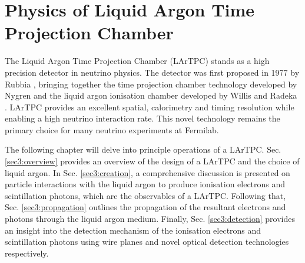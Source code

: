 \chapter{Physics of Liquid Argon Time Projection Chamber}
\label{Chapter3}
\ifpdf
    \graphicspath{{Chapter3/Figs/Raster/}{Chapter3/Figs/PDF/}{Chapter3/Figs/}}
\else
    \graphicspath{{Chapter3/Figs/Vector/}{Chapter3/Figs/}}
\fi


The Liquid Argon Time Projection Chamber (LArTPC) stands as a high precision detector in neutrino physics.
The detector was first proposed in 1977 by Rubbia \cite{Rubbia}, bringing together the time projection chamber technology developed by Nygren \cite{Nygren1, Nygren2} and the liquid argon ionisation chamber developed by Willis and Radeka \cite{WillisRadeka}.
LArTPC provides an excellent spatial, calorimetry and timing resolution while enabling a high neutrino interaction rate.
This novel technology remains the primary choice for many neutrino experiments at Fermilab.

The following chapter will delve into principle operations of a LArTPC.
Sec. \ref{sec3:overview} provides an overview of the design of a LArTPC and the choice of liquid argon.
In Sec. \ref{sec3:creation}, a comprehensive discussion is presented on particle interactions with the liquid argon to produce ionisation electrons and scintillation photons, which are the observables of a LArTPC.
Following that, Sec. \ref{sec3:propagation} outlines the propagation of the resultant electrons and photons through the liquid argon medium.
Finally, Sec. \ref{sec3:detection} provides an insight into the detection mechanism of the ionisation electrons and scintillation photons using wire planes and novel optical detection technologies respectively.

\newpage

